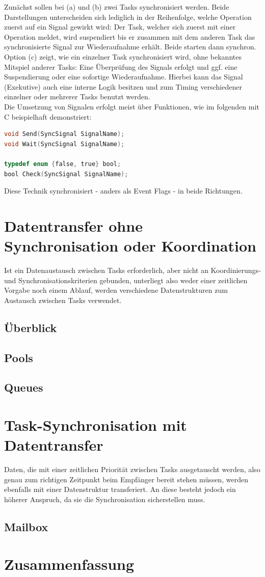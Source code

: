 \documentclass{llncs}
\begin{document}
Zunächst sollen bei (a) und (b) zwei Tasks synchronisiert werden. Beide Darstellungen unterscheiden sich lediglich in der Reihenfolge, welche Operation zuerst auf ein Signal gewirkt wird: Der Task, welcher sich zuerst mit einer Operation meldet, wird suspendiert bis er zusammen mit dem anderen Task das synchronisierte Signal zur Wiederaufnahme erhält. Beide starten dann synchron.
Option (c) zeigt, wie ein einzelner Task synchronisiert wird, ohne bekanntes Mitspiel anderer Tasks: Eine Überprüfung des Signals erfolgt und ggf. eine Suspendierung oder eine sofortige Wiederaufnahme. Hierbei kann das Signal (Exekutive) auch eine interne Logik besitzen und zum Timing verschiedener einzelner oder mehrerer Tasks benutzt werden.\\

Die Umsetzung von Signalen erfolgt meist über Funktionen, wie im folgenden mit C beispielhaft demonstriert:
\begin{lstlisting}[language=C]
void Send(SyncSignal SignalName);
void Wait(SyncSignal SignalName);

typedef enum {false, true} bool;
bool Check(SyncSignal SignalName);
\end{lstlisting}
Diese Technik synchronisiert - anders als Event Flags - in beide Richtungen.

\section{Datentransfer ohne Synchronisation oder Koordination}
Ist ein Datenaustausch zwischen Tasks erforderlich, aber nicht an Koordinierungs- und Synchronisationskriterien gebunden, unterliegt also weder einer zeitlichen Vorgabe noch einem Ablauf, werden verschiedene Datenstrukturen zum Austausch zwischen Tasks verwendet.  
\subsection{Überblick}
\subsection{Pools}
\subsection{Queues}
\section{Task-Synchronisation mit Datentransfer}
Daten, die mit einer zeitlichen Priorität zwischen Tasks ausgetauscht werden, also genau zum richtigen Zeitpunkt beim Empfänger bereit stehen müssen, werden ebenfalls mit einer Datenstruktur transferiert. An diese besteht jedoch ein höherer Anspruch, da sie die Synchronisation sicherstellen muss.
\subsection{Mailbox}
\section{Zusammenfassung}

\printbibliography
\end{document}
